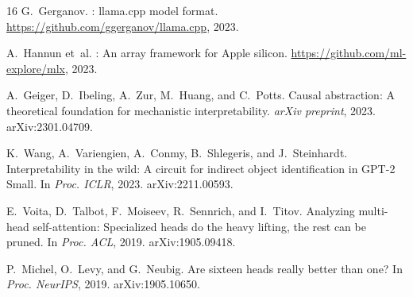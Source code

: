 \documentclass[11pt]{article}
\begin{document}
\begin{thebibliography}{16}
G.~Gerganov.
: {llama.cpp} model format.
\newblock \url{https://github.com/ggerganov/llama.cpp}, 2023.

A.~Hannun et~al.
: An array framework for {Apple} silicon.
\newblock \url{https://github.com/ml-explore/mlx}, 2023.

A.~Geiger, D.~Ibeling, A.~Zur, M.~Huang, and C.~Potts.
\newblock Causal abstraction: A theoretical foundation for mechanistic interpretability.
\newblock \emph{arXiv preprint}, 2023. arXiv:2301.04709.

K.~Wang, A.~Variengien, A.~Conmy, B.~Shlegeris, and J.~Steinhardt.
\newblock Interpretability in the wild: A circuit for indirect object identification in {GPT-2} Small.
\newblock In \emph{Proc. ICLR}, 2023. arXiv:2211.00593.

E.~Voita, D.~Talbot, F.~Moiseev, R.~Sennrich, and I.~Titov.
\newblock Analyzing multi-head self-attention: Specialized heads do the heavy lifting, the rest can be pruned.
\newblock In \emph{Proc. ACL}, 2019. arXiv:1905.09418.

P.~Michel, O.~Levy, and G.~Neubig.
\newblock Are sixteen heads really better than one?
\newblock In \emph{Proc. NeurIPS}, 2019. arXiv:1905.10650.

\end{thebibliography}
\end{document}
